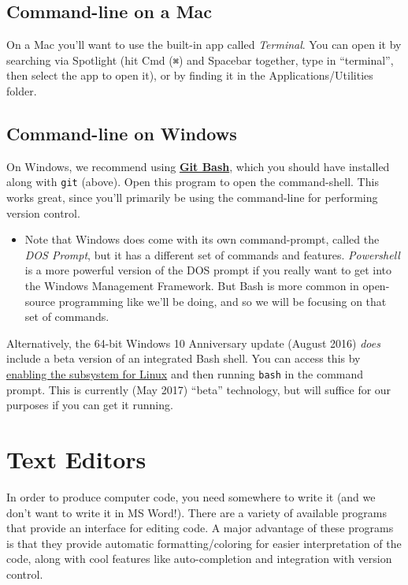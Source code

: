 \documentclass[]{book}
\providecommand{\tightlist}{%
  \setlength{\itemsep}{0pt}\setlength{\parskip}{0pt}}
\theoremstyle{definition}
\theoremstyle{definition}
\theoremstyle{remark}
\begin{document}
\subsection{Command-line on a Mac}\label{command-line-on-a-mac}

On a Mac you'll want to use the built-in app called \emph{Terminal}. You
can open it by searching via Spotlight (hit Cmd (\texttt{⌘}) and
Spacebar together, type in ``terminal'', then select the app to open
it), or by finding it in the Applications/Utilities folder.

\subsection{Command-line on Windows}\label{command-line-on-windows}

On Windows, we recommend using
\href{https://git-scm.com/downloads}{\textbf{Git Bash}}, which you
should have installed along with \texttt{git} (above). Open this program
to open the command-shell. This works great, since you'll primarily be
using the command-line for performing version control.

\begin{itemize}
\tightlist
\item
  Note that Windows does come with its own command-prompt, called the
  \emph{DOS Prompt}, but it has a different set of commands and
  features. \emph{Powershell} is a more powerful version of the DOS
  prompt if you really want to get into the Windows Management
  Framework. But Bash is more common in open-source programming like
  we'll be doing, and so we will be focusing on that set of commands.
\end{itemize}

Alternatively, the 64-bit Windows 10 Anniversary update (August 2016)
\emph{does} include a beta version of an integrated Bash shell. You can
access this by
\href{https://msdn.microsoft.com/en-us/commandline/wsl/install_guide}{enabling
the subsystem for Linux} and then running \texttt{bash} in the command
prompt. This is currently (May 2017) ``beta'' technology, but will
suffice for our purposes if you can get it running.

\section{Text Editors}\label{text-editors}

In order to produce computer code, you need somewhere to write it (and
we don't want to write it in MS Word!). There are a variety of available
programs that provide an interface for editing code. A major advantage
of these programs is that they provide automatic formatting/coloring for
easier interpretation of the code, along with cool features like
auto-completion and integration with version control.
\end{document}
